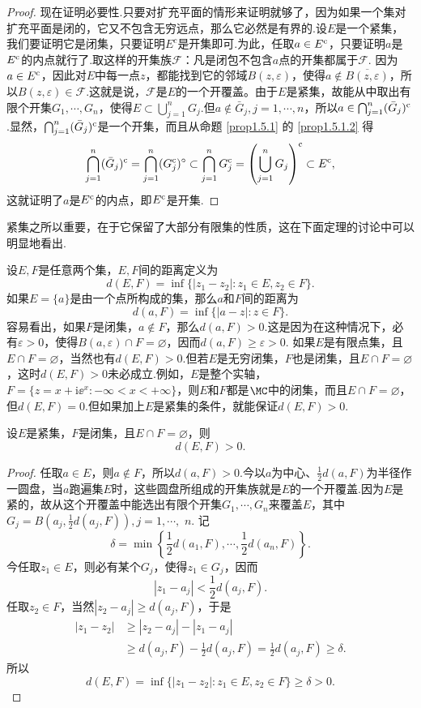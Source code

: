 \begin{proof}
现在证明必要性.只要对扩充平面的情形来证明就够了，因为如果一个集对扩充平面是闭的，它又不包含无穷远点，那么它必然是有界的.设$E$是一个紧集，我们要证明它是闭集，只要证明$E^c$是开集即可.为此，任取$a\in E^{\textrm c}$，只要证明$a$是$E^{\textrm c}$的内点就行了.取这样的开集族$\mathscr F$：凡是闭包不包含$a$点的开集都属于$\mathscr F$. 因为$a\in E^{\textrm c}$，因此对$E$中每一点$z$，都能找到它的邻域$B(z,\varepsilon)$，使得$a\notin \overline{B(z,\varepsilon)}$，所以$B(z,\varepsilon)\in\mathscr F$.这就是说，$\mathscr F$是$E$的一个开覆盖。由于$E$是紧集，故能从中取出有限个开集$G_1,\cdots,G_n$，使得$E\subset\bigcup_{j=1}^nG_j$.但$a\notin \bar G_j,j=1,\cdots,n$，所以$a\in\bigcap_{j=1}^n(\bar G_j)^{\textrm c}$.显然，$\bigcap_{j=1}^n(\bar G_j)^{\textrm c}$是一个开集，而且从命题 \ref{prop1.5.1} 的 \ref{prop1.5.1.2} 得
\[\bigcap_{j=1}^n(\bar G_j)^{\textrm c}=\bigcap_{j=1}^n(G_j^{\textrm c})^\circ\subset\bigcap_{j=1}^nG_j^{\textrm c}=\left(\bigcup_{j=1}^nG_j\right)^{\textrm c}\subset E^{\textrm c},\]
这就证明了$a$是$E^{\textrm c}$的内点，即$E^{\textrm c}$是开集.
\end{proof}

紧集之所以重要，在于它保留了大部分有限集的性质，这在下面定理的讨论中可以明显地看出.

设$E,F$是任意两个集，$E,F$间的距离定义为
\[d(E,F)=\inf \{|z_1-z_2|:z_1\in E,z_2\in F\}.\]
如果$E=\{a\}$是由一个点所构成的集，那么$a$和$F$间的距离为
\[d(a,F)=\inf \{|a-z|:z\in F\}.\]
容易看出，如果$F$是闭集，$a\notin F$，那么$d(a,F)>0$.这是因为在这种情况下，必有$\varepsilon>0$，使得$B(a,\varepsilon)\cap F=\varnothing$，因而$d(a,F)\ge\varepsilon>0$.
如果$E$是有限点集，且$E\cap F=\varnothing$，当然也有$d(E,F)>0$.但若$E$是无穷闭集，$F$也是闭集，且$E\cap F=\varnothing$，这时$d(E,F)>0$未必成立.例如，$E$是整个实轴，$F=\{z=x+\mathrm i\ee^x:-\infty<x<+\infty\}$，则$E$和$F$都是$\MC$中的闭集，而且$E\cap F=\varnothing$，但$d(E,F)=0$.但如果加上$E$是紧集的条件，就能保证$d(E,F)>0$.

\begin{theorem}\label{thm1.5.6}
设$E$是紧集，$F$是闭集，且$E\cap F=\varnothing$，则
\[d(E,F)>0.\]
\end{theorem}
\begin{proof}
任取$a\in E$，则$a\notin F$，所以$d(a,F)>0$.今以$a$为中心、$\frac12d(a,F)$为半径作一圆盘，当$a$跑遍集$E$时，这些圆盘所组成的开集族就是$E$的一个开覆盖.因为$E$是紧的，故从这个开覆盖中能选出有限个开集$G_1,\cdots,G_n$来覆盖$E$，其中$G_j=B\left(a_j,\frac12d(a_j,F)\right),j=1,\cdots,$ $n$. 记
\[\delta=\min\left\{\frac12d(a_1,F),\cdots,\frac12d(a_n,F)\right\}.\]
今任取$z_1\in E$，则必有某个$G_j$，使得$z_1\in G_j$，因而
\[|z_1-a_j|<\frac12d(a_j,F).\]
任取$z_2\in F$，当然$|z_2-a_j|\ge d(a_j,F)$，于是
\begin{align*}
  |z_1-z_2|&\ge|z_2-a_j|-|z_1-a_j|\\
           &\ge d(a_j,F)-\frac12d(a_j,F)=\frac12d(a_j,F)\ge\delta.
\end{align*}
所以
\[d(E,F)=\inf \{|z_1-z_2|:z_1\in E,z_2\in F\}\ge\delta>0.\]
\end{proof}

